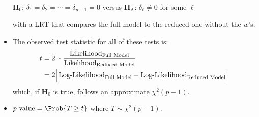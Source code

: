 \begin{itemize}
          \begin{tightcenter}
              $ \mathbf{H}_0 $: $ \delta_1=\delta_2=\cdots=\delta_{p-1}=0 $ versus $ \mathbf{H}_\text{A} $: $ \delta_\ell\ne 0$ for some $ \ell $
          \end{tightcenter}
          with a LRT that compares the full model to the reduced one without the $ w $'s.
    \item The observed test statistic for all of these tests is:
          \begin{align*}
              t & =2\,\log*{\frac{\text{Likelihood}_{\text{Full Model}}}{\text{Likelihood}_{\text{Reduced Model}}}}    \\
                & =2\Bigl[\text{Log-Likelihood}_{\text{Full Model}}-\text{Log-Likelihood}_{\text{Reduced Model}}\Bigr]
          \end{align*}
          which, if $ \mathbf{H}_0 $ is true, follows an approximate $ \chi^2(p-1) $.
    \item $ p\text{-value}=\Prob{T\ge t} $ where $ T \sim \chi^2(p-1) $.
\end{itemize}
